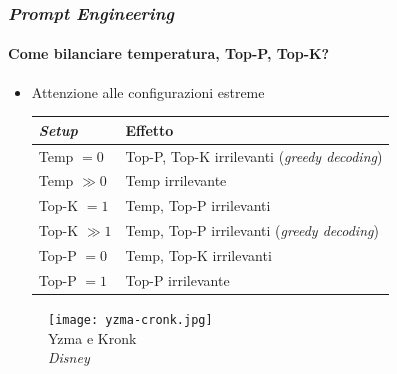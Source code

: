 %
\begin{frame}[t] \frametitle{\emph{Prompt Engineering}}
\framesubtitle{Come bilanciare temperatura, Top-P, Top-K?}
	{\small
	    \begin{minipage}[t]{\textwidth}
			\begin{minipage}[t]{0.55\textwidth}
	    		\begin{itemize}[leftmargin=10pt,align=right]
					\onslide<1->\item[\alert{\faArrowCircleRight}] Attenzione alle configurazioni estreme
                    {\scriptsize
                        \begin{table}
                        \renewcommand{\arraystretch}{1}
                        \centering
                        \begin{tabularx}{\textwidth}{p{}p{}}
                            \toprule
                            \textbf{\emph{Setup}} & \textbf{Effetto}\\
                            \midrule
                            Temp $=0$ & Top-P, Top-K irrilevanti (\alert{\textit{greedy decoding}})\\
                            Temp $\gg 0$ & Temp irrilevante\\
                            \midrule
                            Top-K $=1$ & Temp, Top-P irrilevanti\\
                            Top-K $\gg 1$ & Temp, Top-P irrilevanti (\alert{\textit{greedy decoding}})\\
                            \midrule
                            Top-P $=0$ & Temp, Top-K irrilevanti\\
                            Top-P $=1$ & Top-P irrilevante\\
                            \bottomrule
                        \end{tabularx}
                        \end{table}
                    }
                \end{itemize}
            \end{minipage}
			\hfill
            \begin{minipage}[t]{0.38\textwidth}
                \centering
                \begin{figure}[ht]
                    \texttt{[image: yzma-cronk.jpg]}
                    {\tiny\\Yzma e Kronk\\\vspace*{-1pt}\textit{\textcopyright Disney}}
                \end{figure}
            \end{minipage}
	    \end{minipage}
	}
\end{frame}

